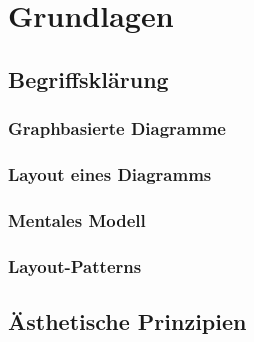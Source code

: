 
\chapter{Grundlagen}

\section{Begriffsklärung}

\subsection{Graphbasierte Diagramme}
\label{subsec:graph-based-diagrams}


\subsection{Layout eines Diagramms}




\subsection{Mentales Modell}
\label{subsec:mental-map}

\cite{Branke01Dynamic} 

\subsection{Layout-Patterns}

% 

\section{Ästhetische Prinzipien}
\label{sec:aesthetics-criteria}





